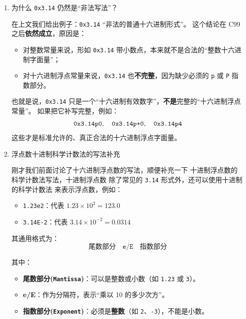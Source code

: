 \begin{enumerate}[label=(\arabic*), wide=0pt]
\begin{lstlisting}[language=C,caption={十六进制浮点常量示例},label={code:hex-float}]
    printf("b = %f\n", b);
    printf("c = %f\n", c);
    printf("d = %f\n", d);
    return 0;
}
\end{lstlisting}

\vspace{1em}




    \item 为什么 \texttt{0x3.14} 仍然是“非法写法”？
    

在上文我们给出例子：\verb|0x3.14| “非法的普通十六进制形式”。  
这个结论在 C99 之后\textbf{依然成立}，原因是：

\begin{itemize}
  \item 对整数常量来说，形如 \verb|0x3.14| 带小数点，本来就不是合法的“整数十六进制字面量”；
  \item 对十六进制浮点常量来说，\verb|0x3.14| 也\textbf{不完整}，因为缺少必须的 \verb|p| 或 \verb|P| 指数部分。
\end{itemize}

也就是说，\verb|0x3.14| 只是一个“十六进制有效数字”，\textbf{不是}完整的“十六进制浮点常量”。  
如果把它补写完整，例如：
\[
  \verb|0x3.14p0|,\quad
  \verb|0x3.14p+0|,\quad
  \verb|0x3.14p4|
\]
这些才是标准允许的、真正合法的十六进制浮点字面量。






    \item 浮点数十进制科学计数法的写法补充
    
刚才我们前面讨论了十六进制浮点数的写法，顺便补充一下
十进制浮点数的科学计数法写法，十进制浮点数
除了常见的 \verb|3.14| 形式外，还可以使用十进制的科学计数法
来表示浮点数，例如：

\begin{itemize}
    \item \verb|1.23e2|：代表 $1.23 \times 10^2 = 123.0$
    \item \verb|3.14E-2|：代表 $3.14 \times 10^{-2} = 0.0314$
\end{itemize}

其通用格式为：
\[
  \texttt{尾数部分} \quad \texttt{e/E} \quad \texttt{指数部分}
\]

其中：
\begin{itemize}
    \item \textbf{尾数部分(\texttt{Mantissa})}：可以是整数或小数（如 \verb|1.23| 或 \verb|3|）。
    \item \textbf{e/E}：作为分隔符，表示“乘以 10 的多少次方”。
    \item \textbf{指数部分(\texttt{Exponent})}：必须是\textbf{整数}（如 \verb|2|、\verb|-3|），不能是小数。
\end{itemize}


\end{enumerate}
